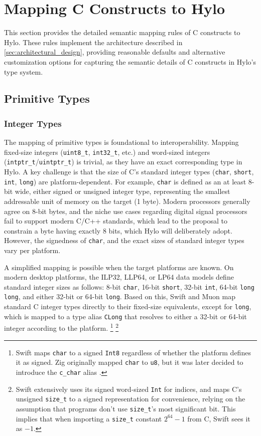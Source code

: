 \section{Mapping C Constructs to Hylo}
\label{sec:mapping_c_constructs}

This section provides the detailed semantic mapping rules of C constructs to Hylo. These rules implement the architecture described in \autoref{sec:architectural_design}, providing reasonable defaults and alternative customization options for capturing the semantic details of C constructs in Hylo's type system.

\subsection{Primitive Types}
\subsubsection{Integer Types}
\label{ssec:integer_types_mapping}
The mapping of primitive types is foundational to interoperability. Mapping fixed-size integers (\texttt{uint8\_t}, \texttt{int32\_t}, etc.) and word-sized integers (\texttt{intptr\_t}/\texttt{uintptr\_t}) is trivial, as they have an exact corresponding type in Hylo. A key challenge is that the size of C's standard integer types (\texttt{char}, \texttt{short}, \texttt{int}, \texttt{long}) are platform-dependent. For example, \texttt{char} is defined as an at least 8-bit wide, either signed or unsigned integer type, representing the smallest addressable unit of memory on the target (1 byte). Modern processors generally agree on 8-bit bytes, and the niche use cases regarding digital signal processors fail to support modern C/C++ standards, which lead to the proposal \cite{P3477R1} to constrain a byte having exactly 8 bits, which Hylo will deliberately adopt. However, the signedness of \texttt{char}, and the exact sizes of standard integer types vary per platform.



A simplified mapping is possible when the target platforms are known. On modern desktop platforms, the ILP32, LLP64, or LP64 data models define standard integer sizes as follows: 8-bit \texttt{char}, 16-bit \texttt{short}, 32-bit \texttt{int}, 64-bit \texttt{long long}, and either 32-bit or 64-bit \texttt{long}. Based on this, Swift and Muon map standard C integer types directly to their fixed-size equivalents, except for \texttt{long}, which is mapped to a type alias \texttt{CLong} that resolves to either a 32-bit or 64-bit integer according to the platform.
\footnote{
    Swift maps \texttt{char} to a signed \texttt{Int8} regardless of whether the platform defines it as signed. Zig originally mapped \texttt{char} to \texttt{u8}, but it was later decided to introduce the \texttt{c\_char} alias \cite{zig-add-cchar}.
}
\footnote{
    Swift extensively uses its signed word-sized \texttt{Int} for indices, and maps C's unsigned \texttt{size\_t} to a signed representation for convenience, relying on the assumption that programs don't use \texttt{size\_t}'s most significant bit. This implies that when importing a \texttt{size\_t} constant $2^{64} -1$ from C, Swift sees it as $-1$.
}


